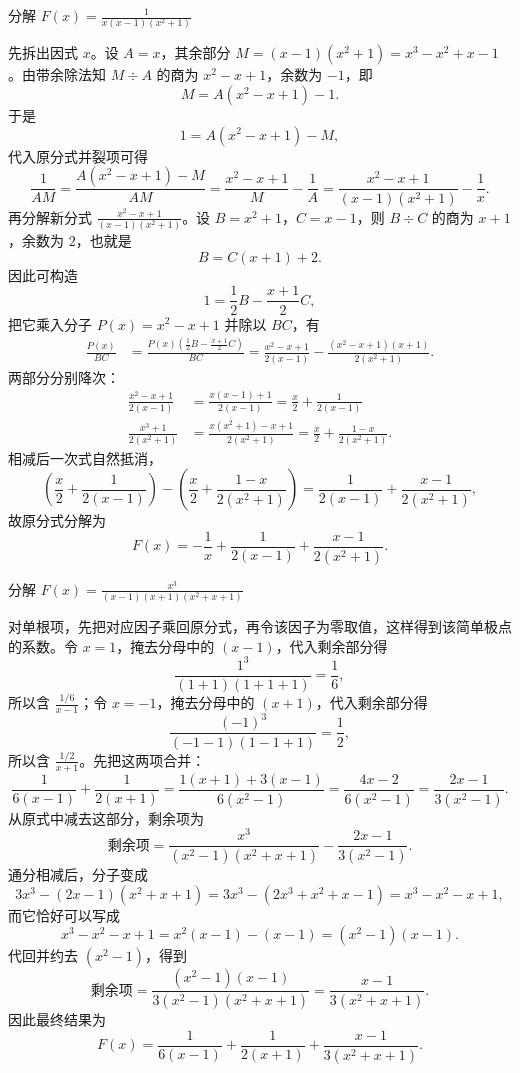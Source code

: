 \begin{example}[分解 $F(x) = \frac{1}{x(x-1)(x^2+1)}$]
    分解 $\displaystyle F(x) = \frac{1}{x(x-1)(x^2+1)}$
\end{example}
\begin{solution}
先拆出因式 $x$。设 $A = x$，其余部分 $M = (x-1)(x^2+1) = x^3 - x^2 + x - 1$。由带余除法知 $M \div A$ 的商为 $x^2-x+1$，余数为 $-1$，即
$$ M = A(x^2-x+1) - 1. $$
于是
$$ 1 = A(x^2-x+1) - M, $$
代入原分式并裂项可得
$$ \frac{1}{AM} = \frac{A(x^2-x+1) - M}{AM} = \frac{x^2-x+1}{M} - \frac{1}{A} = \frac{x^2-x+1}{(x-1)(x^2+1)} - \frac{1}{x}. $$
再分解新分式 $\frac{x^2-x+1}{(x-1)(x^2+1)}$。设 $B = x^2+1$，$C = x-1$，则 $B \div C$ 的商为 $x+1$，余数为 $2$，也就是
$$ B = C(x+1) + 2. $$
因此可构造
$$ 1 = \frac{1}{2}B - \frac{x+1}{2}C, $$
把它乘入分子 $P(x) = x^2-x+1$ 并除以 $BC$，有
\begin{align*}
\frac{P(x)}{BC} &= \frac{P(x)\left(\frac{1}{2}B - \frac{x+1}{2}C\right)}{BC} = \frac{x^2-x+1}{2(x-1)} - \frac{(x^2-x+1)(x+1)}{2(x^2+1)}.
\end{align*}
两部分分别降次：
\begin{align*}
\frac{x^2-x+1}{2(x-1)} &= \frac{x(x-1)+1}{2(x-1)} = \frac{x}{2} + \frac{1}{2(x-1)} \\
\frac{x^3+1}{2(x^2+1)} &= \frac{x(x^2+1)-x+1}{2(x^2+1)} = \frac{x}{2} + \frac{1-x}{2(x^2+1)}.
\end{align*}
相减后一次式自然抵消，
$$ \left(\frac{x}{2} + \frac{1}{2(x-1)}\right) - \left(\frac{x}{2} + \frac{1-x}{2(x^2+1)}\right) = \frac{1}{2(x-1)} + \frac{x-1}{2(x^2+1)}, $$
故原分式分解为
$$ F(x) = -\frac{1}{x} + \frac{1}{2(x-1)} + \frac{x-1}{2(x^2+1)}. $$
\end{solution}

\begin{example}[分解 $\frac{x^3}{(x-1)(x+1)(x^2+x+1)}$]
    分解 $\displaystyle F(x) = \frac{x^3}{(x-1)(x+1)(x^2+x+1)}$
\end{example}
\begin{solution}
对单根项，先把对应因子乘回原分式，再令该因子为零取值，这样得到该简单极点的系数。令 $x=1$，掩去分母中的 $(x-1)$，代入剩余部分得
$$ \frac{1^3}{(1+1)(1+1+1)} = \frac{1}{6}, $$
所以含 $\frac{1/6}{x-1}$；令 $x=-1$，掩去分母中的 $(x+1)$，代入剩余部分得
$$ \frac{(-1)^3}{(-1-1)(1-1+1)} = \frac{1}{2}, $$
所以含 $\frac{1/2}{x+1}$。先把这两项合并：
$$ \frac{1}{6(x-1)} + \frac{1}{2(x+1)} = \frac{1(x+1) + 3(x-1)}{6(x^2-1)} = \frac{4x-2}{6(x^2-1)} = \frac{2x-1}{3(x^2-1)}. $$
从原式中减去这部分，剩余项为
$$ \text{剩余项} = \frac{x^3}{(x^2-1)(x^2+x+1)} - \frac{2x-1}{3(x^2-1)}. $$
通分相减后，分子变成
$$ 3x^3 - (2x-1)(x^2+x+1) = 3x^3 - (2x^3+x^2+x-1) = x^3 - x^2 - x + 1, $$
而它恰好可以写成
$$ x^3 - x^2 - x + 1 = x^2(x-1) - (x-1) = (x^2-1)(x-1). $$
代回并约去 $(x^2-1)$，得到
$$ \text{剩余项} = \frac{(x^2-1)(x-1)}{3(x^2-1)(x^2+x+1)} = \frac{x-1}{3(x^2+x+1)}. $$
因此最终结果为
$$ F(x) = \frac{1}{6(x-1)} + \frac{1}{2(x+1)} + \frac{x-1}{3(x^2+x+1)}. $$
\end{solution}


